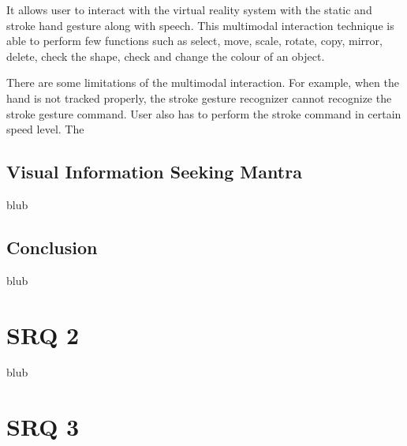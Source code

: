 It allows user to interact with the virtual reality system with the static and stroke hand gesture along with speech. This multimodal interaction technique is able to perform few functions such as select, move, scale, rotate, copy, mirror, delete, check the shape, check and change the colour of an object.
\cite{Chun2015}

There are some limitations of the multimodal interaction. For example, when the hand is not tracked properly, the stroke gesture recognizer cannot recognize the stroke gesture command. User also has to perform the stroke command in certain speed level. The
\cite{Chun2015}



\subsection{Visual Information Seeking Mantra}

blub




\subsection{Conclusion}

blub




\section{SRQ 2}

\label{SectionLiteratureReviewSRQ2}

blub




\section{SRQ 3}

